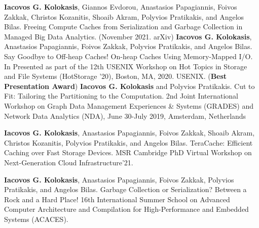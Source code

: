 



\begin{cventries}
  \cventry
    {}
    {}
    {}
    {}
	{\textbf{Iacovos G. Kolokasis}, Giannos Evdorou, Anastasios
	Papagiannis, Foivos Zakkak, Christos Kozanitis, Shoaib Akram,
	Polyvios Pratikakis, and Angelos Bilas. Freeing Compute Caches
	from Serialization and Garbage Collection in Managed Big Data
	Analytics. (November 2021. arXiv)}
  {}
  \cventry
    {}
    {}
    {}
    {}
    {\textbf{Iacovos G. Kolokasis}, Anastasios Papagiannis, Foivos
    Zakkak, Polyvios Pratikakis, and Angelos Bilas.%
    Say Goodbye to Off-heap Caches! On-heap Caches Using Memory-Mapped
    I/O. In Presented as part of the 12th USENIX Workshop on Hot
    Topics in Storage and File Systems (HotStorage '20), Boston, MA,
    2020. USENIX. (\textbf{Best Presentation Award})}
  {}
  \cventry
    {}
    {}
    {}
    {}
    {\textbf{Iacovos G. Kolokasis} and Polyvios
  Pratikakis. Cut to Fit: Tailoring the Partitioning to the
  Computation. 2nd Joint International Workshop on Graph Data
  Management Experiences \& Systems (GRADES) and Network Data
  Analytics (NDA), June 30-July 2019, Amsterdam, Netherlands}
  {}

\end{cventries}


\vspace{-15pt}
\begin{cventries}
  \cventry
    {}
    {}
    {}
    {}
    {\textbf{Iacovos G. Kolokasis}, Anastasios Papagiannis, Foivos
    Zakkak, Shoaib Akram, Christos Kozanitis, Polyvios Pratikakis, and Angelos Bilas.%
	TeraCache: Efficient Caching over Fast Storage Devices. 
	MSR Cambridge PhD Virtual Workshop on Next-Generation Cloud Infrastructure'21.
	}
  {}

  \cventry
    {}
    {}
    {}
    {}
    {\textbf{Iacovos G. Kolokasis}, Anastasios Papagiannis, Foivos
    Zakkak, Polyvios Pratikakis, and Angelos Bilas.%
	Garbage
    Collection or Serialization? Between a Rock and a Hard Place! 
    16th International Summer School on Advanced Computer Architecture
    and Compilation for High-Performance and Embedded Systems
    (ACACES).}
  {}

\end{cventries}
      
